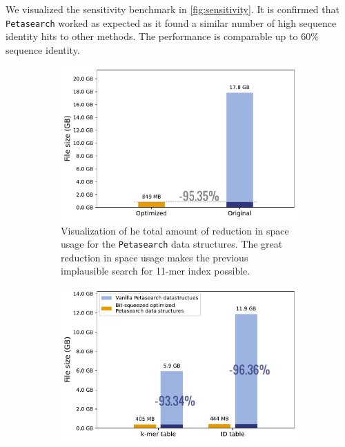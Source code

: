 We visualized the sensitivity benchmark in \autoref{fig:sensitivity}. It is confirmed that \texttt{Petasearch} worked as expected as it found a similar number of high sequence identity hits to other methods. The performance is comparable up to $60\%$ sequence identity.

\pagebreak
\begin{figpage}
  \captionsetup[figure]{width=.9\linewidth}
  \captionsetup[subfigure]{
    width=.9\linewidth
  }
  \centering
  \begin{figure}
    \begin{subfigure}{0.5\textwidth}
      \centering
      \includegraphics[width=\textwidth]{images/bitsqueeze_alternative.pdf}
      \centering
      \caption{Visualization of he total amount of reduction in space usage for the \texttt{Petasearch} data structures.
        The great reduction in space usage makes the previous implausible search for 11-mer index possible.}
      \label{fig:total_effect_of_bitsqueeze}
    \end{subfigure}
    \begin{subfigure}{0.5\textwidth}
      \centering
      \includegraphics[width=\textwidth]{images/bitsqueeze_optimization.pdf}

\end{subfigure}
\end{figure}
\end{figpage}
